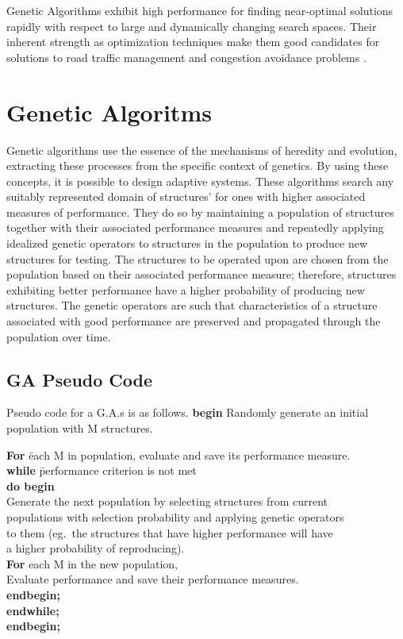 \documentclass[a4paper,10pt]{article}
\begin{document}
Genetic Algorithms exhibit high performance for finding near-optimal solutions rapidly with respect to large and dynamically changing search spaces. Their inherent strength as optimization techniques make them good candidates for solutions to road traffic management and congestion avoidance problems \cite{dynam} \cite{genren}.

\section{Genetic Algoritms}
Genetic algorithms use the essence of the mechanisms of heredity and evolution, extracting these processes from the specific context of genetics. By using these concepts, it is possible to design adaptive systems. These algorithms search any suitably represented domain of structures' for
ones with higher associated measures of performance. They do so by maintaining a population of structures together with their associated performance measures and repeatedly applying idealized genetic operators to structures in the population to produce new structures for testing. The structures to be operated upon are chosen from the population based on their associated performance measure; therefore, structures exhibiting better performance have a higher probability of producing new structures. The genetic operators are such that characteristics of a structure associated with good performance are preserved and propagated through the population over time.

\subsection{GA Pseudo Code}
Pseudo code for a G.A.s is as follows.
\newline
\newline
\textbf{begin}
\newline
Randomly generate an initial population with M structures.
\newline
\begin{tabbing}
\textbf{For}  \= each M in population, evaluate and save its performance measure.\\
\> \textbf{while} \= performance criterion is not met \\
\> \> \textbf{do begin} \= \\
\> \> \> Generate the next population by selecting structures from current\\ 
\> \> \> populations with selection probability and applying genetic operators\\ 
\> \> \> to them (eg.\ the structures that have higher performance will have\\ 
\> \> \> a higher probability of reproducing).\\
\> \> \textbf{For} each M in the new population, \\
\> \> \> Evaluate performance and save their performance measures.\\
\> \> \textbf{endbegin;}\\
\> \textbf{endwhile;}\\
\textbf{endbegin;}
\end{tabbing}
\end{document}
